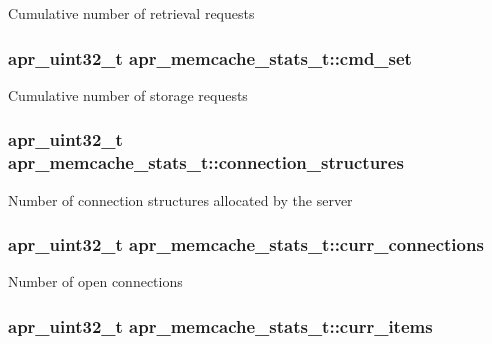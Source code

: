 Cumulative number of retrieval requests \hypertarget{structapr__memcache__stats__t_a4930557b41d879b1b4767862c1693f95}{
\subsubsection[{cmd\-\_\-set}]{\setlength{\rightskip}{0pt plus 5cm}apr\-\_\-uint32\-\_\-t apr\-\_\-memcache\-\_\-stats\-\_\-t\-::cmd\-\_\-set}}\label{structapr__memcache__stats__t_a4930557b41d879b1b4767862c1693f95}
Cumulative number of storage requests \hypertarget{structapr__memcache__stats__t_ac155c7a510e94b3cd43aea90a05e3cd3}{
\subsubsection[{connection\-\_\-structures}]{\setlength{\rightskip}{0pt plus 5cm}apr\-\_\-uint32\-\_\-t apr\-\_\-memcache\-\_\-stats\-\_\-t\-::connection\-\_\-structures}}\label{structapr__memcache__stats__t_ac155c7a510e94b3cd43aea90a05e3cd3}
Number of connection structures allocated by the server \hypertarget{structapr__memcache__stats__t_a1db1876674d978f4f70ae465a060bfc2}{
\subsubsection[{curr\-\_\-connections}]{\setlength{\rightskip}{0pt plus 5cm}apr\-\_\-uint32\-\_\-t apr\-\_\-memcache\-\_\-stats\-\_\-t\-::curr\-\_\-connections}}\label{structapr__memcache__stats__t_a1db1876674d978f4f70ae465a060bfc2}
Number of open connections \hypertarget{structapr__memcache__stats__t_abe0f28297441a55d30a6c7c8e0faaea3}{
\subsubsection[{curr\-\_\-items}]{\setlength{\rightskip}{0pt plus 5cm}apr\-\_\-uint32\-\_\-t apr\-\_\-memcache\-\_\-stats\-\_\-t\-::curr\-\_\-items}}\label{structapr__memcache__stats__t_abe0f28297441a55d30a6c7c8e0faaea3}
